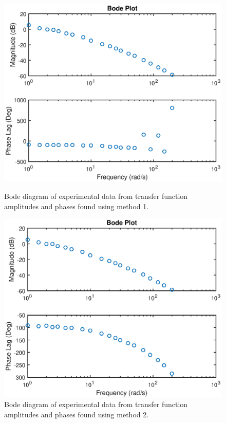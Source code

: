 \documentclass{article}
\begin{document}
\begin{figure}[H]
	\hspace{0.5cm}
	\begin{minipage}{7cm}
		\centering
		\includegraphics[scale=0.5]{fig3}
		\caption{Bode diagram of experimental data from transfer function amplitudes and phases found using method 1.}
	\end{minipage}
	\hspace{1cm}
	\begin{minipage}{7cm}
		\centering
		\includegraphics[scale=0.5]{fig5}
		\caption{Bode diagram of experimental data from transfer function amplitudes and phases found using method 2.}
	\end{minipage}	
\end{figure}
\end{document}
